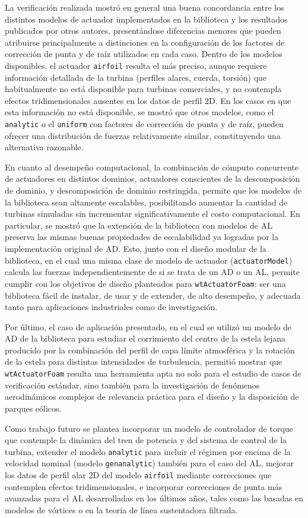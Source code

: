 La verificación realizada mostró en general una buena concordancia entre los distintos modelos de actuador implementados en la biblioteca y los resultados publicados por otros autores, presentándose diferencias menores que pueden atribuirse principalmente a distinciones en la configuración de los factores de corrección de punta y de raíz utilizados en cada caso. Dentro de los modelos disponibles, el actuador \texttt{airfoil} resulta el más preciso, aunque requiere información detallada de la turbina (perfiles alares, cuerda, torsión) que habitualmente no está disponible para turbinas comerciales, y no contempla efectos tridimensionales ausentes en los datos de perfil 2D. En los casos en que esta información no está disponible, se mostró que otros modelos, como el \texttt{analytic} o el \texttt{uniform} con factores de corrección de punta y de raíz, pueden ofrecer una distribución de fuerzas relativamente similar, constituyendo una alternativa razonable.

En cuanto al desempeño computacional, la combinación de cómputo concurrente de actuadores en distintos dominios, actuadores conscientes de la descomposición de dominio, y descomposición de dominio restringida, permite que los modelos de la biblioteca sean altamente escalables, posibilitando aumentar la cantidad de turbinas simuladas sin incrementar significativamente el costo computacional. En particular, se mostró que la extensión de la biblioteca con modelos de AL preserva las mismas buenas propiedades de escalabilidad ya logradas por la implementación original de AD. Esto, junto con el diseño modular de la biblioteca, en el cual una misma clase de modelo de actuador (\texttt{actuatorModel}) calcula las fuerzas independientemente de si se trata de un AD o un AL, permite cumplir con los objetivos de diseño planteados para \texttt{wtActuatorFoam}: ser una biblioteca fácil de instalar, de usar y de extender, de alto desempeño, y adecuada tanto para aplicaciones industriales como de investigación.

Por último, el caso de aplicación presentado, en el cual se utilizó un modelo de AD de la biblioteca para estudiar el corrimiento del centro de la estela lejana producido por la combinación del perfil de capa límite atmosférica y la rotación de la estela para distintas intensidades de turbulencia, permitió mostrar que \texttt{wtActuatorFoam} resulta una herramienta apta no solo para el estudio de casos de verificación estándar, sino también para la investigación de fenómenos aerodinámicos complejos de relevancia práctica para el diseño y la disposición de parques eólicos.

Como trabajo futuro se plantea incorporar un modelo de controlador de torque que contemple la dinámica del tren de potencia y del sistema de control de la turbina, extender el modelo \texttt{analytic} para incluir el régimen por encima de la velocidad nominal (modelo \texttt{genanalytic}) también para el caso del AL, mejorar los datos de perfil alar 2D del modelo \texttt{airfoil} mediante correcciones que contemplen efectos tridimensionales, e incorporar correcciones de punta más avanzadas para el AL desarrolladas en los últimos años, tales como las basadas en modelos de vórtices o en la teoría de línea sustentadora filtrada.

